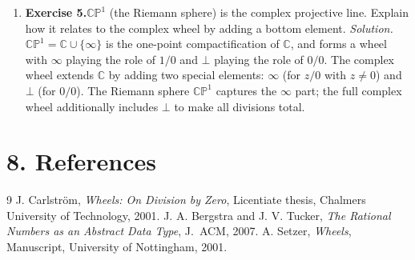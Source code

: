 \begin{enumerate}[leftmargin=*,itemsep=0.9em]
\item \textbf{Exercise 5.}$\mathbb{CP}^1$ (the Riemann sphere) is the complex projective line. Explain how it relates to the complex wheel by adding a bottom element. \emph{Solution.}$\mathbb{CP}^1 = \mathbb{C} \cup \{\infty\}$ is the one-point compactification of $\mathbb{C}$, and forms a wheel with $\infty$ playing the role of $1/0$ and $\bot$ playing the role of $0/0$. The complex wheel extends $\mathbb{C}$ by adding two special elements: $\infty$ (for $z/0$ with $z \neq 0$) and $\bot$ (for $0/0$). The Riemann sphere $\mathbb{CP}^1$ captures the $\infty$ part; the full complex wheel additionally includes $\bot$ to make all divisions total.

\end{enumerate}
\section*{8. References}
\begin{thebibliography}{9}
 J. Carlstr{\"o}m, \emph{Wheels: On Division by Zero}, Licentiate thesis, Chalmers University of Technology, 2001.
 J. A. Bergstra and J. V. Tucker, \emph{The Rational Numbers as an Abstract Data Type}, J.\ ACM, 2007.
 A. Setzer, \emph{Wheels}, Manuscript, University of Nottingham, 2001.
\end{thebibliography}
